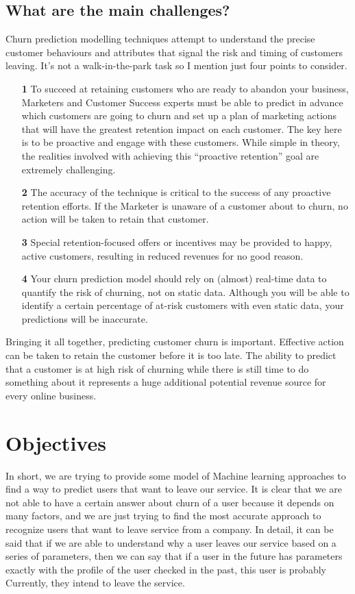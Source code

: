 \documentclass[12pt]{article}
\begin{document}
\subsection{What are the main challenges?}
Churn prediction modelling techniques attempt to understand the precise customer behaviours and attributes that signal the risk and timing of customers leaving. It’s not a walk-in-the-park task so I mention just four points to consider.
\begin{itemize}
  \item[\textbf{1}] To succeed at retaining customers who are ready to abandon your business, Marketers and Customer Success experts must be able to predict in advance which customers are going to churn and set up a plan of marketing actions that will have the greatest retention impact on each customer. The key here is to be proactive and engage with these customers. While simple in theory, the realities involved with achieving this “proactive retention” goal are extremely challenging.
  \item[\textbf{2}] The accuracy of the technique is critical to the success of any proactive retention efforts. If the Marketer is unaware of a customer about to churn, no action will be taken to retain that customer.
  \item[\textbf{3}] Special retention-focused offers or incentives may be provided to happy, active customers, resulting in reduced revenues for no good reason.
  \item[\textbf{4}] Your churn prediction model should rely on (almost) real-time data to quantify the risk of churning, not on static data. Although you will be able to identify a certain percentage of at-risk customers with even static data, your predictions will be inaccurate. 
\end{itemize}
Bringing it all together, predicting customer churn is important. Effective action can be taken to retain the customer before it is too late. The ability to predict that a customer is at high risk of churning while there is still time to do something about it represents a huge additional potential revenue source for every online business.


\section{Objectives}
In short, we are trying to provide some model of Machine learning approaches to find a way to predict users that want to leave our service. It is clear that we are not able to have a certain answer about churn of a user because it depends on many factors, and we are just trying to find the most accurate approach to recognize users that want to leave service from a company. In detail, it can be said that if we are able to understand why a user leaves our service based on a series of parameters, then we can say that if a user in the future has parameters exactly with the profile of the user checked in the past, this user is probably Currently, they intend to leave the service.
\end{document}
